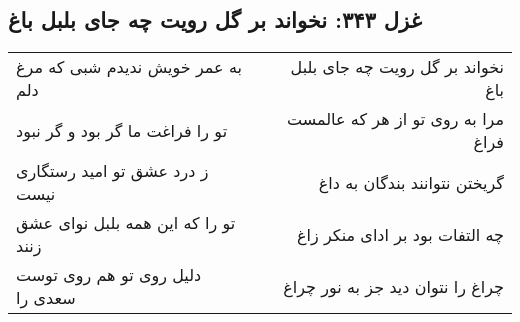 \begin{center}
\section*{غزل ۳۴۳: نخواند بر گل رویت چه جای بلبل باغ}
\label{sec:343}
\begin{longtable}{l p{0.5cm} r}
به عمر خویش ندیدم شبی که مرغ دلم
&&
نخواند بر گل رویت چه جای بلبل باغ
\\
تو را فراغت ما گر بود و گر نبود
&&
مرا به روی تو از هر که عالمست فراغ
\\
ز درد عشق تو امید رستگاری نیست
&&
گریختن نتوانند بندگان به داغ
\\
تو را که این همه بلبل نوای عشق زنند
&&
چه التفات بود بر ادای منکر زاغ
\\
دلیل روی تو هم روی توست سعدی را
&&
چراغ را نتوان دید جز به نور چراغ
\\
\end{longtable}
\end{center}
